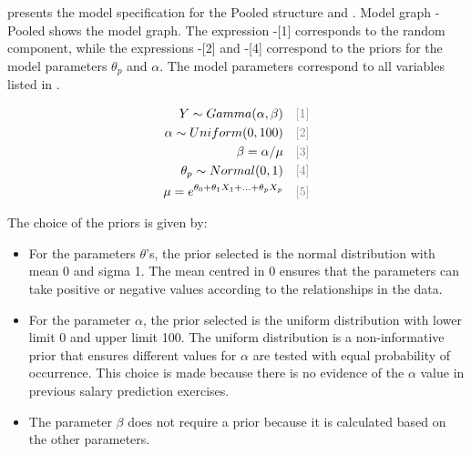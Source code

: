  presents the model specification for the Pooled structure and . Model graph - Pooled shows the model graph. The expression -[1] corresponds to the random component, while the expressions -[2] and -[4] correspond to the priors for the model parameters $\theta_p$ and $\alpha$. The model parameters correspond to all variables listed in .

\begin{gather}
    \begin{split}
        Y \sim Gamma(\alpha,\beta) \quad \textcolor{gray}{[\text{1}]} \\
        \alpha \sim Uniform(0, 100) \quad \textcolor{gray}{[\text{2}]} \\
        \beta=\alpha/\mu \quad \textcolor{gray}{[\text{3}]} \\
        \theta_{p} \sim Normal(0, 1) \quad \textcolor{gray}{[\text{4}]} \\
        \mu=e^{\theta_0+\theta_{1}X_{1}+...+\theta_{p}X_{p}} \quad \textcolor{gray}{[\text{5}]} \\
    \end{split}
    \label{eq:pooled_model}
\end{gather}

The choice of the priors is given by: 
\begin{itemize}
    \item For the parameters $\theta$'s, the prior selected is the normal distribution with mean 0 and sigma 1. The mean centred in 0 ensures that the parameters can take positive or negative values according to the relationships in the data. 

    \item For the parameter $\alpha$, the prior selected is the uniform distribution with lower limit 0 and upper limit 100. The uniform distribution is a non-informative prior that ensures different values for $\alpha$ are tested with equal probability of occurrence. This choice is made because there is no evidence of the $\alpha$ value in previous salary prediction exercises. 
    
    \item The parameter $\beta$ does not require a prior because it is calculated based on the other parameters. 
\end{itemize}

